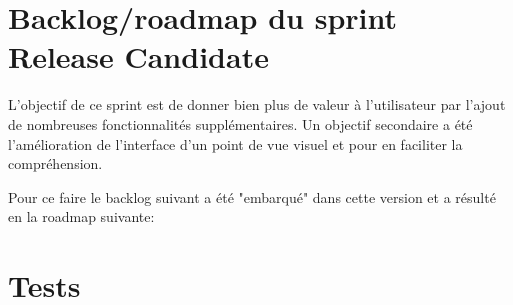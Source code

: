 \section{Backlog/roadmap du sprint Release Candidate}

L’objectif de ce sprint est de donner bien plus de valeur à l'utilisateur par l’ajout 
de nombreuses fonctionnalités supplémentaires. Un objectif secondaire a été l'amélioration 
de l’interface d’un point de vue visuel et pour en faciliter la compréhension. 

Pour ce faire le backlog suivant a été "embarqué" dans cette version et a résulté en la roadmap suivante:



\section{Tests}


